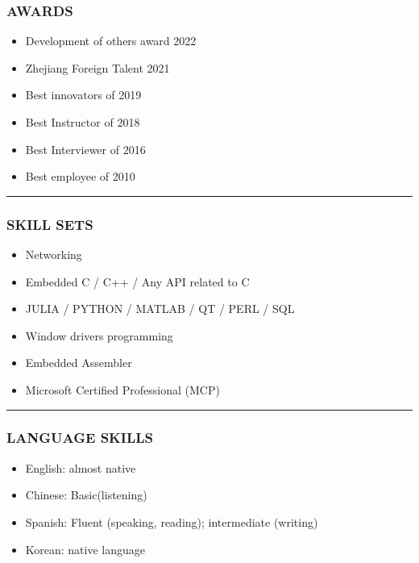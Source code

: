 \documentclass[12pt,a4paper]{article}
\begin{document}
\subsubsection{AWARDS}
\begin{itemize}
\item Development of others award 2022


\item Zhejiang Foreign Talent 2021


\item Best innovators of 2019


\item Best Instructor of 2018


\item Best Interviewer of 2016


\item Best employee of 2010

\end{itemize}
\rule{\textwidth}{1pt}
\subsubsection{SKILL SETS}
\begin{itemize}
\item Networking


\item Embedded C / C++ / Any API related to C


\item JULIA / PYTHON / MATLAB / QT / PERL / SQL


\item Window drivers programming


\item Embedded Assembler  


\item Microsoft Certified Professional (MCP)

\end{itemize}
\rule{\textwidth}{1pt}
\subsubsection{LANGUAGE SKILLS}
\begin{itemize}
\item English: almost native


\item Chinese: Basic(listening)


\item Spanish: Fluent (speaking, reading); intermediate (writing) 


\item Korean: native language

\end{itemize}
\end{document}
